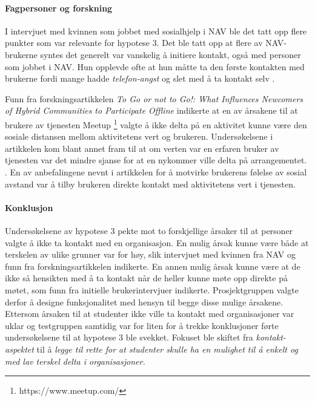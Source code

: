 \paragraph{Fagpersoner og forskning}
I intervjuet med kvinnen som jobbet med sosialhjelp i NAV ble det tatt opp flere punkter som var relevante for hypotese 3. Det ble tatt opp at flere av NAV-brukerne syntes det generelt var vanskelig å initiere kontakt, også med personer som jobbet i NAV. Hun opplevde ofte at hun måtte ta den første kontakten med brukerne fordi mange hadde {\em telefon-angst} og slet med å ta kontakt selv \cite{NAV-INTERVJU:16}.

Funn fra forskningsartikkelen {\em To Go or not to Go!: What Influences Newcomers of Hybrid Communities to Participate Offline} indikerte at en av årsakene til at brukere av tjenesten Meetup \footnote{https://www.meetup.com/} valgte å ikke delta på en aktivitet kunne være den sosiale distansen mellom aktivitetens vert og brukeren. Undersøkelsene i artikkelen kom blant annet fram til at om verten var en erfaren bruker av tjenesten var det mindre sjanse for at en nykommer ville delta på arrangementet. . En av anbefalingene nevnt i artikkelen for å motvirke brukerens følelse av sosial avstand var å tilby brukeren direkte kontakt med aktivitetens vert i tjenesten. \cite{NEWCOMERS:4:CT17}

\paragraph{Konklusjon}
Undersøkelsene av hypotese 3 pekte mot to forskjellige årsaker til at personer valgte å ikke ta kontakt med en organisasjon. En mulig årsak kunne være både at terskelen av ulike grunner var for høy, slik intervjuet med kvinnen fra NAV og funn fra forskningsartikkelen indikerte. En annen mulig årsak kunne være at de ikke så hensikten med å ta kontakt når de heller kunne møte opp direkte på møtet, som funn fra initielle brukerintervjuer indikerte. Prosjektgruppen valgte derfor å designe funksjonalitet med hensyn til begge disse mulige årsakene. Ettersom årsaken til at studenter ikke ville ta kontakt med organisasjoner var uklar og testgruppen samtidig var for liten for å trekke konklusjoner førte undersøkelsene til at hypotese 3 ble svekket. Fokuset ble skiftet fra {\em kontakt-aspektet} til å {\em legge til rette for at studenter skulle ha en mulighet til å enkelt og med lav terskel delta i organisasjoner.}


